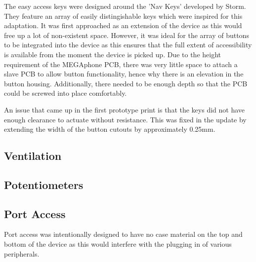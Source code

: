 The easy access keys were designed around the 'Nav Keys' developed by Storm. 
They feature an array of easily distingishable keys which were inspired for this adaptation. 
It was first approached as an extension of the device as this would free up a lot of non-existent space.
However, it was ideal for the array of buttons to be integrated into the device as this ensures that the full extent of accessibility is available from the moment the device is picked up.
Due to the height requirement of the MEGAphone PCB, there was very little space to attach a slave PCB to allow button functionality, hence why there is an elevation in the button housing.
Additionally, there needed to be enough depth so that the PCB could be screwed into place comfortably.

An issue that came up in the first prototype print is that the keys did not have enough clearance to actuate without resistance.
This was fixed in the update by extending the width of the button cutouts by approximately 0.25mm. %


\subsection{Ventilation}


\subsection{Potentiometers}


\subsection{Port Access}

Port access was intentionally designed to have no case material on the top and bottom of the device as this would interfere with the plugging in of various peripherals.


